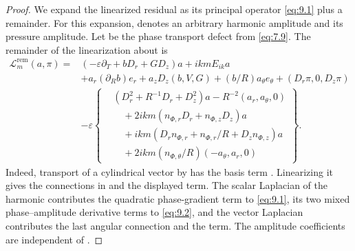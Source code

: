 \begin{proof}
We expand the linearized residual as its principal operator \eqref{eq:9.1} plus a remainder. For this
expansion,  denotes an arbitrary harmonic amplitude and
 its pressure amplitude. Let
%
 be the phase
transport defect from \eqref{eq:7.9}. The remainder of the linearization about
 is
\begin{equation}
\begin{aligned}
\mathscr L_m^{\mathrm{rem}}(a,\pi)={}&
 (-\varepsilon\partial_T+bD_r+GD_z)a+ikmE_{ik}a\\
&+a_r(\partial_Rb)e_r+a_zD_z(b,V,G)+(b/R)a_\theta e_\theta
 +(D_r\pi,0,D_z\pi)\\
&-\varepsilon\left\{
\begin{aligned}
 &(D_r^2+R^{-1}D_r+D_z^2)a-R^{-2}(a_r,a_\theta,0)\\
 &\quad+2ikm(n_{\Phi,r}D_r+n_{\Phi,z}D_z)a\\
 &\quad+ikm(D_rn_{\Phi,r}+n_{\Phi,r}/R+D_zn_{\Phi,z})a\\
 &\quad+2ikm(n_{\Phi,\theta}/R)(-a_\theta,a_r,0)
\end{aligned}
\right\}.
\end{aligned}
\tag{9.2}\label{eq:9.2}
\end{equation}
Indeed, transport of a cylindrical vector  by
 has the basis term
. Linearizing it gives the connections
in  and the displayed  term. The scalar
Laplacian of the harmonic contributes the quadratic phase-gradient term to \eqref{eq:9.1}, its two
mixed phase--amplitude derivative terms to \eqref{eq:9.2}, and the vector Laplacian contributes the
last angular connection and the  term. The amplitude coefficients are
independent of .


\end{proof}
